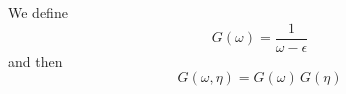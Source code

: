 \documentclass{article}
\begin{document}
We define
\begin{equation} G(\omega) = \frac{1}{\omega-\epsilon} \end{equation}
and then
\begin{equation} G(\omega, \eta) = G(\omega)\,G(\eta) \end{equation}
\end{document}
